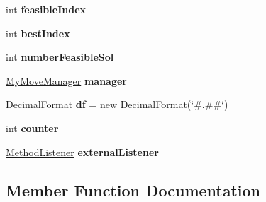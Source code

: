 \begin{DoxyCompactItemize}
\item 
int {\bfseries feasible\+Index}\hypertarget{classtabu_1_1_my_search_program_a2c809f9e2e20d84deaff754a72aadbe9}{}\label{classtabu_1_1_my_search_program_a2c809f9e2e20d84deaff754a72aadbe9}

\item 
int {\bfseries best\+Index}\hypertarget{classtabu_1_1_my_search_program_a076cfddd2fce2e2e3ac7376cde30033d}{}\label{classtabu_1_1_my_search_program_a076cfddd2fce2e2e3ac7376cde30033d}

\item 
int {\bfseries number\+Feasible\+Sol}\hypertarget{classtabu_1_1_my_search_program_ae9604e83c73d5d883fc40431782f86e3}{}\label{classtabu_1_1_my_search_program_ae9604e83c73d5d883fc40431782f86e3}

\item 
\hyperlink{classtabu_1_1_my_move_manager}{My\+Move\+Manager} {\bfseries manager}\hypertarget{classtabu_1_1_my_search_program_aede586da83b2b769a1a1146f6c2b95ba}{}\label{classtabu_1_1_my_search_program_aede586da83b2b769a1a1146f6c2b95ba}

\item 
Decimal\+Format {\bfseries df} = new Decimal\+Format(\char`\"{}\#.\#\#\char`\"{})\hypertarget{classtabu_1_1_my_search_program_a54c073afd2b33605eeb5c201730ee3a5}{}\label{classtabu_1_1_my_search_program_a54c073afd2b33605eeb5c201730ee3a5}

\item 
int {\bfseries counter}\hypertarget{classtabu_1_1_my_search_program_aec4ea1be1510e769098ffeb60afe2a20}{}\label{classtabu_1_1_my_search_program_aec4ea1be1510e769098ffeb60afe2a20}

\item 
\hyperlink{interfacesvrptw_1_1_method_listener}{Method\+Listener} {\bfseries external\+Listener}\hypertarget{classtabu_1_1_my_search_program_a05add34336e59876c4e1e87c16223d28}{}\label{classtabu_1_1_my_search_program_a05add34336e59876c4e1e87c16223d28}

\end{DoxyCompactItemize}


\subsection{Member Function Documentation}
